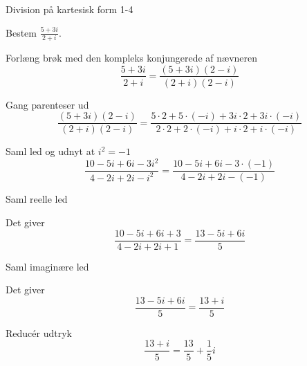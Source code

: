 \documentclass{article}
\begin{document}
\begin{exercise}{Division på kartesisk form 1-4}
	
	Bestem $\frac{5+3i}{2+i}$.
	
	
	
	\hint 
	
	Forlæng brøk med den kompleks konjungerede af nævneren
	\[
	\frac{5+3i}{2+i} = \frac{(5+3i)(2-i)}{(2+i)(2-i)}
	\]
	
	\hint
	
	Gang parenteser ud
	\[
	\frac{(5+3i)(2-i)}{(2+i)(2-i)} = \frac{5 \cdot 2 + 5 \cdot (-i) + 3i \cdot 2 + 3i \cdot (-i)}{2 \cdot 2 + 2 \cdot (-i) + i \cdot 2 + i \cdot (-i)}
	\]
	
	\hint 
	
	Saml led og udnyt at $i^2 = -1$
	\[
	\frac{10 -5i + 6i -3i^2}{4 - 2i +2i -i^2} = \frac{10 -5i + 6i -3 \cdot (-1)}{4 - 2i +2i -(-1)} 
	\]
	
	\hint
	
	Saml reelle led
	
	\hint
	
	Det giver
	\[
	\frac{10 -5i +6i+3}{4 -2i+2i +1} = \frac{13 - 5i +6i}{5}
	\]
	
	\hint
	
	Saml imaginære led
	
	
	\hint
	
	Det giver 
	\[
	\frac{13 - 5i +6i}{5} = \frac{13 +i}{5}
	\]
	
	\hint
	
	Reducér udtryk
	\[
	\frac{13 +i}{5} = \frac{13}{5} + \frac{1}{5}i
	\]
	
\end{exercise}

\newpage
\end{document}
